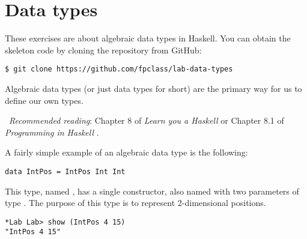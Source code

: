 \section{Data types}
\label{sec:lab-data-types}

These exercises are about algebraic data types in Haskell. You can obtain the skeleton code by cloning the repository from GitHub:
\begin{verbatim}
$ git clone https://github.com/fpclass/lab-data-types
\end{verbatim}
Algebraic data types (or just data types for short) are the primary way for us to define our own types.

\makebox[0.5cm]{\faBook}~\emph{Recommended reading}: Chapter 8 of \emph{Learn you a Haskell} \citep{lipovaca2011learn} or Chapter 8.1 of \emph{Programming in Haskell} \citep{hutton2016programming}.

\taskLine

A fairly simple example of an algebraic data type is the following:
\begin{verbatim}
data IntPos = IntPos Int Int
\end{verbatim}
This type, named , has a single constructor, also named  with two parameters of type . The purpose of this type is to represent 2-dimensional positions.



\begin{verbatim}
*Lab Lab> show (IntPos 4 15)
"IntPos 4 15"
\end{verbatim}


